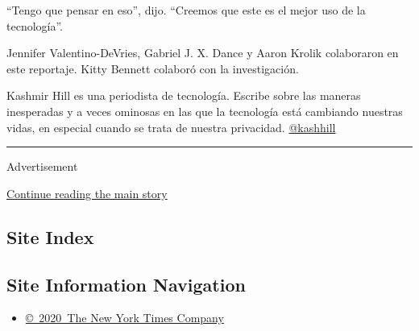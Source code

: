 ``Tengo que pensar en eso'', dijo. ``Creemos que este es el mejor uso de
la tecnología''.

Jennifer Valentino-DeVries, Gabriel J. X. Dance y Aaron Krolik
colaboraron en este reportaje. Kitty Bennett colaboró con la
investigación.

Kashmir Hill es una periodista de tecnología. Escribe sobre las maneras
inesperadas y a veces ominosas en las que la tecnología está cambiando
nuestras vidas, en especial cuando se trata de nuestra privacidad.
\href{https://twitter.com/kashhill?ref_src=twsrc\%5Egoogle\%7Ctwcamp\%5Eserp\%7Ctwgr\%5Eauthor}{@kashhill}

\begin{center}\rule{0.5\linewidth}{\linethickness}\end{center}

Advertisement

\protect\hyperlink{after-bottom}{Continue reading the main story}

\hypertarget{site-index}{%
\subsection{Site Index}\label{site-index}}

\hypertarget{site-information-navigation}{%
\subsection{Site Information
Navigation}\label{site-information-navigation}}

\begin{itemize}
\tightlist
\item
  \href{https://help.nytimes.com/hc/en-us/articles/115014792127-Copyright-notice}{©~2020~The
  New York Times Company}
\end{itemize}

